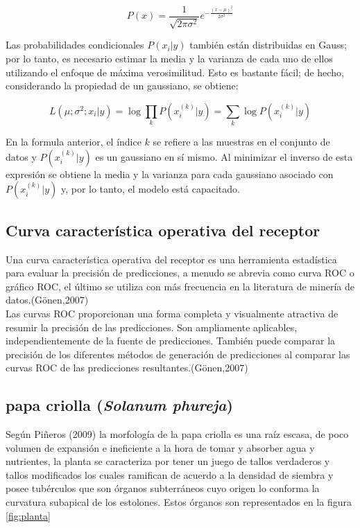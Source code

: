 \[
P\left(x\right) = \frac{1}{\sqrt{2\pi\sigma^{2}}}e^{-\frac{\left(x-\mu\right)^{2}}{2\sigma^{2}}}
\]

Las probabilidades condicionales $P\left(x_{i} | y\right)$ también están distribuidas en Gauss; por lo tanto, es necesario estimar la media y la varianza de cada uno de ellos utilizando el enfoque de máxima verosimilitud. Esto es bastante fácil; de hecho, considerando la propiedad de un gaussiano, se obtiene:

\[
L\left(\mu;\sigma^{2};x_{i} | y\right)=\log\prod_{k}P\left(x_{i}^{\left(k\right)}|y\right)=\sum_{k}\log P\left(x_{i}^{\left(k\right)}|y\right)
\]

En la formula anterior, el índice $k$ se refiere a las muestras en el conjunto de datos y $P\left(x_{i}^{\left(k\right)}|y\right)$ es un gaussiano en sí mismo. Al minimizar el inverso de esta expresión se obtiene la media y la varianza para cada gaussiano asociado con $P\left(x_{i}^{\left(k\right)}|y\right)$ y, por lo tanto, el modelo está capacitado.

\subsection{Curva característica operativa del receptor}

Una curva característica operativa del receptor es una herramienta estadística para evaluar la precisión de predicciones, a menudo se abrevia como curva ROC o gráfico ROC, el último se utiliza con más frecuencia en la literatura de minería de datos.(Gönen,2007)\\

Las curvas ROC proporcionan una forma completa y visualmente atractiva de resumir la precisión de las predicciones. Son ampliamente aplicables, independientemente de la fuente de predicciones. También puede comparar la precisión de los diferentes métodos de generación de predicciones al comparar las curvas ROC de las predicciones resultantes.(Gönen,2007)

\subsection{papa criolla (\textit{Solanum phureja})}

Según Piñeros (2009) la morfología de la papa criolla es una raíz escasa, de poco volumen de expansión e ineficiente a la hora de tomar y absorber agua y nutrientes, la planta se caracteriza por tener un juego de tallos verdaderos y tallos modificados los cuales ramifican de acuerdo a la densidad de siembra y  posee tubérculos que son órganos subterráneos cuyo origen lo conforma la curvatura subapical de los estolones. Estos órganos son representados en la figura \ref{fig:planta}\\

